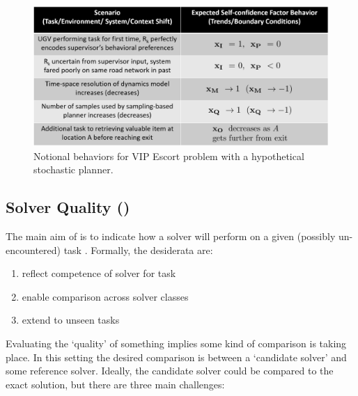 \begin{figure}[tbp]
    \centering
    \includegraphics[width=0.99\linewidth]{Figures/scTrendsBoundaryExample.png}
    \caption{Notional \famsec behaviors for VIP Escort problem with a hypothetical stochastic planner.}
    \label{fig:roadnet}
    \vspace{-0.3 in}
\end{figure}

\subsection{Solver Quality (\xQ)} \label{sec:SQ}
    The main aim of \xQ{} is to indicate how a solver \solve{} will perform on a given (possibly un-encountered) task \task{}. Formally, the desiderata are:

    \begin{enumerate}[label=\textbf{D\arabic*}]
        \item reflect competence of solver \solve{} for task \task{} \label{itm:d1}
        \item enable comparison across solver classes \label{itm:d2}
        \item extend to unseen tasks \label{itm:d3}
    \end{enumerate}
    
     Evaluating the `quality' of something implies some kind of comparison is taking place. In this setting the desired comparison is between a `candidate solver' \solve{} and some reference solver. Ideally, the candidate solver could be compared to the exact solution, but there are three main challenges:

